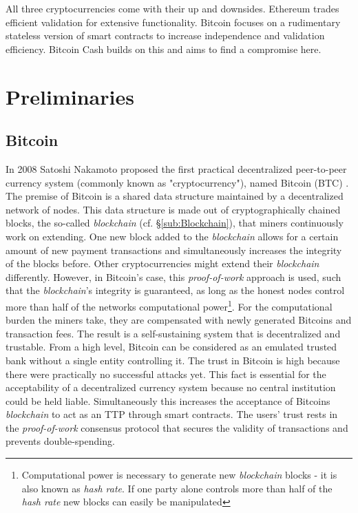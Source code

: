 \documentclass{cacthesis}
\newcounter{protocol}
\begin{document}
        All three cryptocurrencies come with their up and downsides. Ethereum trades efficient validation for extensive functionality. Bitcoin focuses on a rudimentary stateless version of smart contracts to increase independence and validation efficiency. Bitcoin Cash builds on this and aims to find a compromise here.
            
            
    \chapter{Preliminaries}
        \section{Bitcoin}
        \label{sec:BTC}
        In 2008 Satoshi Nakamoto proposed the first practical decentralized peer-to-peer currency system (commonly known as "cryptocurrency"), named Bitcoin (BTC) \cite{nakamoto2009bitcoin}. The premise of Bitcoin is a shared data structure maintained by a decentralized network of nodes. This data structure is made out of cryptographically chained blocks, the so-called \textit{blockchain} (cf. §\ref{sub:Blockchain}), that miners continuously work on extending. One new block added to the \textit{blockchain} allows for a certain amount of new payment transactions and simultaneously increases the integrity of the blocks before. Other cryptocurrencies might extend their \textit{blockchain} differently. However, in Bitcoin's case, this \textit{proof-of-work} approach is used, such that the \textit{blockchain}'s integrity is guaranteed, as long as the honest nodes control more than half of the networks computational power\footnote{Computational power is necessary to generate new \textit{blockchain} blocks - it is also known as \textit{hash rate}. If one party alone controls more than half of the \textit{hash rate} new blocks can easily be manipulated}. For the computational burden the miners take, they are compensated with newly generated Bitcoins and transaction fees. The result is a self-sustaining system that is decentralized and trustable. From a high level, Bitcoin can be considered as an emulated trusted bank without a single entity controlling it. The trust in Bitcoin is high because there were practically no successful attacks yet. This fact is essential for the acceptability of a decentralized currency system because no central institution could be held liable. Simultaneously this increases the acceptance of Bitcoins \textit{blockchain} to act as an TTP through smart contracts. The users' trust rests in the \textit{proof-of-work} consensus protocol that secures the validity of transactions and prevents double-spending. \\
\end{document}
